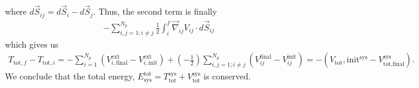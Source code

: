 where $d\vec{S}_{ij} = d\vec{S}_{i} - d\vec{S}_{j}$. Thus, the second term is finally
\begin{align}
    -\sum_{i,j=1;i \neq j}^{N_{p}} \frac{1}{2} \int_{i}^{f} \vec{\nabla}_{ij} V_{ij} \cdot d\vec{S}_{ij}
\end{align}
which gives us
\begin{align}
    T_{\text{tot},f} - T_{\text{tot},i} = -\sum_{i=1}^{N_{p}} \left( V_{i,\text{final}}^{\text{ext}} - V_{i,\text{init}}^{\text{ext}} \right) + (-\frac{1}{2}) \sum_{i,j=1;i \neq j}^{N_{p}} (V_{ij}^{\text{final}}-V_{ij}^{\text{init}}) = -(V_{\text{tot}},\text{init}^{\text{sys}} - V_{\text{tot},\text{final}}^{\text{sys}}).
\end{align}
We conclude that the total energy, $E_{\text{sys}}^{\text{tot}} = T_{\text{tot}}^{\text{sys}} + V_{\text{tot}}^{\text{sys}}$ is conserved.